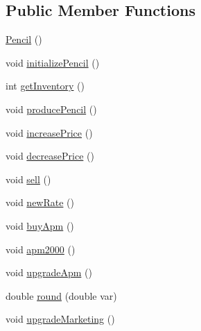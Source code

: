 \subsection*{Public Member Functions}
\begin{DoxyCompactItemize}
\item 
\hyperlink{classPencil_a0dbfad3eebde26e9d5dacace449d9e14}{Pencil} ()
\item 
void \hyperlink{classPencil_a582594d67f32d7cb427f1bbe2824382b}{initialize\+Pencil} ()
\item 
int \hyperlink{classPencil_aa629f185016565c847bb0a401634f0e5}{get\+Inventory} ()
\item 
void \hyperlink{classPencil_ae966b635fd81f8d346aaa7f8f782f143}{produce\+Pencil} ()
\item 
void \hyperlink{classPencil_a075683b2e85f8819e71f365c097e5f61}{increase\+Price} ()
\item 
void \hyperlink{classPencil_a84aeeb98b1caa424d92c312e56e42797}{decrease\+Price} ()
\item 
void \hyperlink{classPencil_a2731dadbd64edeee0a1cc773a79eee24}{sell} ()
\item 
void \hyperlink{classPencil_a759af90fe58f6399e831f2c53c0470bd}{new\+Rate} ()
\item 
void \hyperlink{classPencil_a506c7c9587a026f1238e880b1b103c2f}{buy\+Apm} ()
\item 
void \hyperlink{classPencil_ad1f8942401865e05d2a220f64a309f3e}{apm2000} ()
\item 
void \hyperlink{classPencil_aaeb664bbf0ab3796bc548eccee5924ed}{upgrade\+Apm} ()
\item 
double \hyperlink{classPencil_a9bbb66405447f4cc218ecbd1a09b7c3b}{round} (double var)
\item 
void \hyperlink{classPencil_a4d1fff5599020013b3b52cf84d714847}{upgrade\+Marketing} ()
\end{DoxyCompactItemize}
